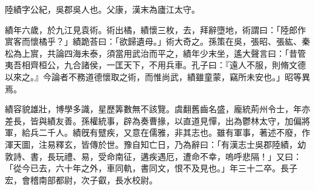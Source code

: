 \begin{pinyinscope}
 
 
 陸績字公紀，吳郡吳人也。父康，漢末為廬江太守。
 
 
 績年六歲，於九江見袁術。術出橘，績懷三枚，去，拜辭墮地，術謂曰：「陸郎作賔客而懷橘乎？」績跪荅曰：「欲歸遺母。」術大奇之。孫策在吳，張昭、張紘、秦松為上賔，共論四海未泰，須當用武治而平之，績年少末坐，遙大聲言曰：「昔管夷吾相齊桓公，九合諸侯，一匡天下，不用兵車。孔子曰：『遠人不服，則脩文德以來之。』今論者不務道德懷取之術，而惟尚武，績雖童蒙，竊所未安也。」昭等異焉。
 
 
績容貌雄壯，博學多識，星歷筭數無不該覽。虞翻舊齒名盛，龐統荊州令士，年亦差長，皆與績友善。孫權統事，辟為奏曹掾，以直道見憚，出為鬱林太守，加偏將軍，給兵二千人。績旣有躄疾，又意在儒雅，非其志也。雖有軍事，著述不廢，作渾天圖，注易釋玄，皆傳於世。豫自知亡日，乃為辭曰：「有漢志士吳郡陸績，幼敦詩、書，長玩禮、易，受命南征，遘疾遇厄，遭命不幸，嗚呼悲隔！」又曰：「從今已去，六十年之外，車同軌，書同文，恨不及見也。」年三十二卒。長子宏，會稽南部都尉，次子叡，長水校尉。
 
 
\end{pinyinscope}